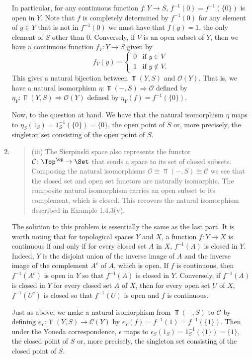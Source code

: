 \documentclass[../../main]{subfiles}
\begin{document}
\begin{enumerate}
In particular, for any continuous function $f\colon Y\rightarrow S$, 
$f^{-1}(0)=f^{-1}(\{0\})$ is open in $Y$. Note that $f$ is completely 
determined by $f^{-1}(0)$ for any element of $y\in Y$ that is not in 
$f^{-1}(0)$ we must have that $f(y)=1$, the only element of $S$ other than $0$. 
Conversely, if $V$ is an open subset of $Y$, then we have a continuous function 
$f_V\colon Y\rightarrow S$ given by 
\[f_V(y)=\begin{cases}0 &\text{if }y\in V\\1 &\text{if }y\notin V.\end{cases}\]
This gives a natural bijection between $\Top(Y,S)$ and $\mathcal{O}(Y)$. That 
is, we have a natural isomorphism $\eta\colon \Top(-,S)\Rightarrow\mathcal O$ 
defined by $\eta_Y\colon \Top(Y,S)\Rightarrow{\mathcal O}(Y)$ defined by 
$\eta_Y(f)=f^{-1}(\{0\})$. 

Now, to the question at hand. We have that the natural isomorphism $\eta$ maps 
to $\eta_S(1_S)=1_S^{-1}(\{0\})=\{0\}$, the open point of $S$ or, more 
precisely, the singleton set consisting of the open point of $S$.
\item 
\begin{quote}
(iii) The Sierpinski space also represents the functor ${\mathcal C}\colon 
\Top^\op\rightarrow\Set$ that sends a space to its set of closed subsets. 
Composing the natural isomorphisms ${\mathcal O}\cong\Top{(-,S)}\cong{\mathcal 
C}$ we see that the closed set and open set functors are naturally 
isomorphic. The composite natural isomorphism carries an open subset to its 
complement, which is closed. This recovers the natural isomorphism described in 
Example 1.4.3(v).
\end{quote}
The solution to this problem is essentially the same as the last part. It is 
worth noting that for topological spaces $Y$ and $X$, a function $f\colon 
Y\rightarrow X$ is continuous if and only if for every closed set $A$ in $X$, 
$f^{-1}(A)$ is closed in $Y$. Indeed, $Y$ is the disjoint union of the inverse 
image of $A$ and the inverse image of the complement $A^c$ of $A$, which is 
open. If $f$ is continuous, then $f^{-1}(A^c)$ is open in $Y$ so that 
$f^{-1}(A)$ is closed in $Y$. Conversely, if $f^{-1}(A)$ is closed in $Y$ for 
every closed set $A$ of $X$, then for every open set $U$ of $X$, $f^{-1}(U^c)$ 
is closed so that $f^{-1}(U)$ is open and $f$ is continuous.

Just as above, we make a natural isomorphism from $\Top(-,S)$ to $\mathcal C$ 
by defining $\epsilon_Y\colon \Top(Y,S)\rightarrow{\mathcal C}(Y)$ by 
$\epsilon_Y(f)=f^{-1}(1)=f^{-1}(\{1\})$. Then under the Yoneda correspondence, 
$\epsilon$ maps to $\epsilon_S(1_S)=1_S^{-1}(\{1\})=\{1\}$, the closed point of 
$S$ or, more precisely, the singleton set consisting of the closed point of $S$.
\end{enumerate}
\end{document}
